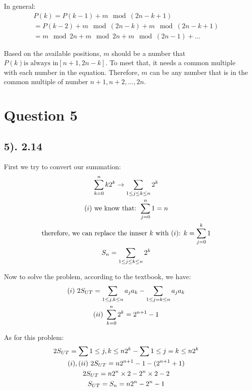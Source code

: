 \documentclass[12pt]{article}
\newcommand{\RNum}[1]{\uppercase\expandafter{\romannumeral #1\relax}}
\begin{document}
In general:
\begin{gather*}
    P(k) = P(k-1) + m \mod {(2n-k+1)} \\
    = P(k-2) + m \mod {(2n-k)} + m \mod {(2n-k+1)} \\
    = m \mod 2n + m \mod 2n + m \mod {(2n-1)} + \ldots
\end{gather*}

Based on the available positions, $m$ should be a number that $P(k) \text{is always in} [n+1, 2n-k]$. To meet that, it needs a common multiple with each number
in the equation. Therefore, $m$ can be any number that is in the common multiple of number $n+1, n+2, \ldots, 2n$.

\section*{Question 5}
\subsection*{5). 2.14}
First we try to convert our summation:
\begin{gather*}
    \sum_{k=0}^n k2^k \to \sum_{1 \leq j \leq k \leq n } 2^k \\
    \text{($\RNum{1}$) we know that: } \sum_{j=0}^n 1 = n \\
    \text{therefore, we can replace the innser $k$ with ($\RNum{1}$): } k = \sum_{j=0}^k 1 \\
    S_{n} = \sum_{1 \leq j \leq k \leq n} 2^k
\end{gather*}

Now to solve the problem, according to the textbook, we have:
\begin{gather*}
    \text{$(\RNum{1})$ } 2S_{UT} = \sum_{1 \leq j,k \leq n} a_{j}a_{k} - \sum_{1 \leq j=k \leq n} a_{j}a_{k} \\
    \text{$(\RNum{2})$ } \sum_{k=0}^n 2^k = 2^{n+1} - 1
\end{gather*}

As for this problem:
\begin{gather*}
    2S_{UT} = \sum{1 \leq j,k \leq n} 2^k - \sum{1 \leq j=k \leq n} 2^k \\
    \text{$(\RNum{1}), (\RNum{2})$ } 2S_{UT} = n2^{n+1} - 1 - (2^{n+1} + 1) \\
    2S_{UT} = n2^{n} \times 2 - 2^n \times 2 - 2 \\
    S_{UT} = S_{n} = n2^{n} - 2^n - 1 
\end{gather*}
\end{document}
